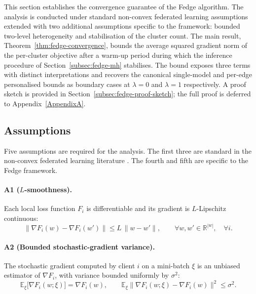 This section establishes the convergence guarantee of the Fedge algorithm. The analysis is conducted under standard non-convex federated learning assumptions extended with two additional assumptions specific to the framework: bounded two-level heterogeneity and stabilisation of the cluster count. The main result, Theorem~\ref{thm:fedge-convergence}, bounds the average squared gradient norm of the per-cluster objective after a warm-up period during which the inference procedure of Section~\ref{subsec:fedge-mh} stabilises. The bound exposes three terms with distinct interpretations and recovers the canonical single-model and per-edge personalised bounds as boundary cases at $\lambda = 0$ and $\lambda = 1$ respectively. A proof sketch is provided in Section~\ref{subsec:fedge-proof-sketch}; the full proof is deferred to Appendix~\ref{AppendixA}.

\subsection{Assumptions}
\label{subsec:fedge-assumptions}

Five assumptions are required for the analysis. The first three are standard in the non-convex federated learning literature \cite{karimireddy2020scaffold, fang2024hierarchical, jiang2024partial}. The fourth and fifth are specific to the Fedge framework.

\paragraph{A1 ($L$-smoothness).}
Each local loss function $F_i$ is differentiable and its gradient is $L$-Lipschitz continuous:
\begin{equation}
\label{eq:asm-smooth}
\big\| \nabla F_i(w) - \nabla F_i(w') \big\| \leq L \, \| w - w' \|, \qquad \forall w, w' \in \mathbb{R}^{|w|}, \quad \forall i.
\end{equation}

\paragraph{A2 (Bounded stochastic-gradient variance).}
The stochastic gradient computed by client $i$ on a mini-batch $\xi$ is an unbiased estimator of $\nabla F_i$, with variance bounded uniformly by $\sigma^2$:
\begin{equation}
\label{eq:asm-var}
\mathbb{E}_\xi \big[ \nabla F_i(w; \xi) \big] = \nabla F_i(w), \qquad \mathbb{E}_\xi \big\| \nabla F_i(w; \xi) - \nabla F_i(w) \big\|^2 \leq \sigma^2.
\end{equation}

